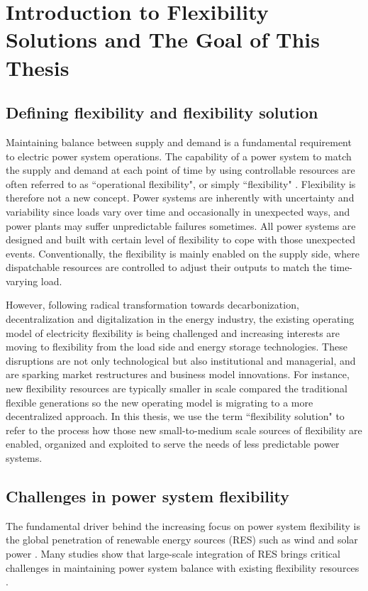 \chapter{Introduction to Flexibility Solutions and The Goal of This Thesis}
\label{ch:introduction}

\section{Defining flexibility and flexibility solution}
Maintaining balance between supply and demand is a fundamental requirement to electric power system operations. The capability of a power system to match the supply and demand at each point of time by using controllable resources are often referred to as ``operational flexibility", or simply ``flexibility" \cite{Cochran2014,Wang2017,Lund2015,Delft}. Flexibility is therefore not a new concept. Power systems are inherently with uncertainty and variability since loads vary over time and occasionally in unexpected ways, and power plants may suffer unpredictable failures sometimes. All power systems are designed and built with certain level of flexibility to cope with those unexpected events. Conventionally, the flexibility is mainly enabled on the supply side, where dispatchable resources are controlled to adjust their outputs to match the time-varying load.

However, following radical transformation towards decarbonization, decentralization and digitalization in the energy industry, the existing operating model of electricity flexibility is being challenged and increasing interests are moving to flexibility from the load side and energy storage technologies\cite{Lund2015,Bronski2015,McKinsey&Company2010}. These disruptions are not only technological but also institutional and managerial, and are sparking market restructures and business model innovations. For instance, new flexibility resources are typically smaller in scale compared the traditional flexible generations so the new operating model is migrating to a more decentralized approach. In this thesis, we use the term ``flexibility solution" to refer to the process how those new small-to-medium scale sources of flexibility are enabled, organized and exploited to serve the needs of less predictable power systems.

\section[Challenges in power system flexibility]{Challenges in power system flexibility%
	}
The fundamental driver behind the increasing focus on power system flexibility is the global penetration of renewable energy sources (RES) such as wind and solar power \cite{Agency2016}. Many studies show that large-scale integration of RES brings critical challenges in maintaining power system balance with existing flexibility resources \cite{Cochran2014,Wang2017,Lund2015,FraunhoferIWES2015,Muller2016,Kwon2014,Kondziella2016,Papaefthymiou2016,Alizadeh2016,Bertsch2016}. 


